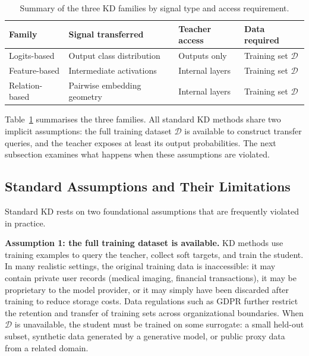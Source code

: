 \begin{table}[t]
  \centering
  \caption{Summary of the three KD families by signal type and access requirement.}
  \label{tab:kd-taxonomy}
  \begin{tabular}{llll}
    \hline
    \textbf{Family} & \textbf{Signal transferred} & \textbf{Teacher access} & \textbf{Data required} \\
    \hline
    Logits-based    & Output class distribution   & Outputs only            & Training set $\mathcal{D}$ \\
    Feature-based   & Intermediate activations    & Internal layers         & Training set $\mathcal{D}$ \\
    Relation-based  & Pairwise embedding geometry & Internal layers         & Training set $\mathcal{D}$ \\
    \hline
  \end{tabular}
\end{table}

\begin{foldable}
  Table~\ref{tab:kd-taxonomy} summarises the three families.
  All standard KD methods share two implicit assumptions: the full training dataset $\mathcal{D}$ is available to construct transfer queries, and the teacher exposes at least its output probabilities.
  The next subsection examines what happens when these assumptions are violated.
\end{foldable}

\subsection{Standard Assumptions and Their Limitations}
\label{sec:23-background-kdfoundations-assumptions}

\begin{foldable}
  Standard KD rests on two foundational assumptions that are frequently violated in practice.
\end{foldable}

\begin{foldable}
  \textbf{Assumption 1: the full training dataset is available.}
  KD methods use training examples to query the teacher, collect soft targets, and train the student.
  In many realistic settings, the original training data is inaccessible: it may contain private user records (medical imaging, financial transactions), it may be proprietary to the model provider, or it may simply have been discarded after training to reduce storage costs.
  Data regulations such as GDPR further restrict the retention and transfer of training sets across organizational boundaries.
  When $\mathcal{D}$ is unavailable, the student must be trained on some surrogate: a small held-out subset, synthetic data generated by a generative model, or public proxy data from a related domain.
\end{foldable}


